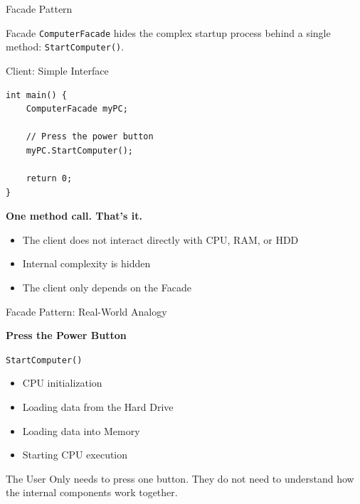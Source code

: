 \documentclass[aspectratio=169]{beamer}
\begin{document}
\begin{frame}{Facade Pattern}
\begin{block}{Facade}
    \texttt{ComputerFacade} hides the complex startup process
    behind a single method: \texttt{StartComputer()}.
\end{block}
\end{frame}


\begin{frame}[fragile]{Client: Simple Interface}

\begin{lstlisting}
int main() {
    ComputerFacade myPC;

    // Press the power button
    myPC.StartComputer();

    return 0;
}
\end{lstlisting}

\begin{center}
    \Large
    \textbf{One method call. That's it.}
\end{center}

\begin{itemize}
    \item The client does not interact directly with CPU, RAM, or HDD
    \item Internal complexity is hidden
    \item The client only depends on the Facade
\end{itemize}

\end{frame}

\begin{frame}{Facade Pattern: Real-World Analogy}

\begin{center}
    \Large
    \textbf{Press the Power Button}
\end{center}

\begin{center}
    \texttt{StartComputer()}
\end{center}

\begin{itemize}
    \item CPU initialization
    \item Loading data from the Hard Drive
    \item Loading data into Memory
    \item Starting CPU execution
\end{itemize}

\begin{block}{The User}
    Only needs to press one button.
    They do not need to understand how the internal components work together.
\end{block}

\end{frame}
\end{document}
